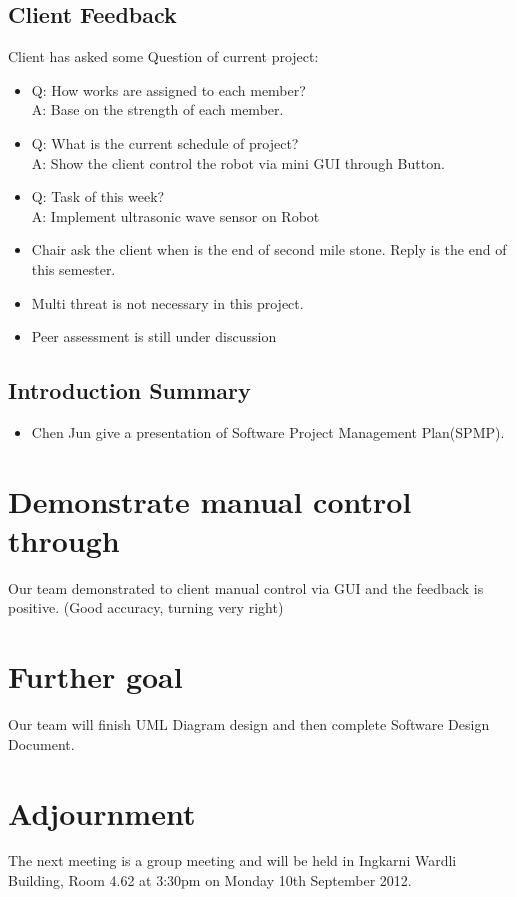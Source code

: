 \documentclass[11pt, a4paper]{article}
\begin{document}
\subsection{Client Feedback}
Client has asked some Question of current project:
\begin{itemize}
\item Q: How works are assigned to each member? \\
      A: Base on the strength of each member.
\item Q: What is the current schedule of project?\\
      A: Show the client control the robot via mini GUI through Button.
\item Q: Task of this week?\\
      A: Implement ultrasonic wave sensor on Robot
\item Chair ask the client when is the end of second mile stone. Reply is the end of this semester.
\item Multi threat is not necessary in this project.
\item Peer assessment is still under discussion
\end{itemize}

\subsection{Introduction Summary}
\begin{itemize}
\item  Chen Jun give a presentation of Software Project Management Plan(SPMP).
\end{itemize}


\section{Demonstrate manual control through}
Our team demonstrated to client manual control via GUI and the feedback is positive. (Good accuracy, turning very right)


\section{Further goal}
Our team will finish UML Diagram design and then complete Software Design Document.

\section{Adjournment}
The next meeting is a group meeting and will be held in Ingkarni Wardli Building, Room 4.62 at 3:30pm on Monday 10th September 2012.

\vspace*{10pt}
\end{document}
